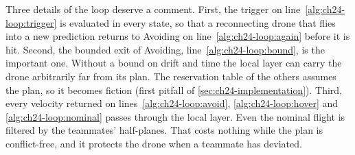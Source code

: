 Three details of the loop deserve a comment. First, the trigger on
line~\ref{alg:ch24-loop:trigger} is evaluated in every state, so that a
reconnecting drone that flies into a new prediction returns to Avoiding on
line~\ref{alg:ch24-loop:again} before it is hit. Second, the bounded exit of
Avoiding, line~\ref{alg:ch24-loop:bound}, is the important one. Without a
bound on drift and time the local layer can carry the drone arbitrarily far
from its plan. The reservation table of the others assumes the plan, so it
becomes fiction (first pitfall of \cref{sec:ch24-implementation}).
Third, every velocity returned on lines~\ref{alg:ch24-loop:avoid},
\ref{alg:ch24-loop:hover} and \ref{alg:ch24-loop:nominal} passes through the
local layer. Even the nominal flight is filtered by the teammates'
half-planes. That costs nothing while the plan is conflict-free, and it
protects the drone when a teammate has deviated.

